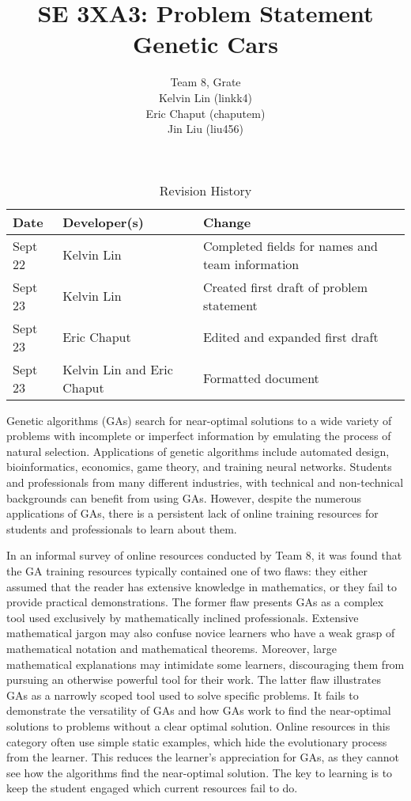 \documentclass{article}
\title{SE 3XA3: Problem Statement\\Genetic Cars}
\author{Team 8, Grate
		\\ Kelvin Lin (linkk4)
		\\ Eric Chaput (chaputem)
		\\ Jin Liu (liu456)
}
\date{}
\begin{document}
\begin{table}[hp]
\color{blue}
\caption{Revision History} \label{TblRevisionHistory}
\begin{tabularx}{\textwidth}{llX}
\toprule
\textbf{Date} & \textbf{Developer(s)} & \textbf{Change}\\
\midrule
Sept 22 & Kelvin Lin & Completed fields for names and team information\\
Sept 23 & Kelvin Lin & Created first draft of problem statement\\
Sept 23 & Eric Chaput & Edited and expanded first draft\\
Sept 23 & Kelvin Lin and Eric Chaput& Formatted document\\

\bottomrule
\end{tabularx}
\end{table}

\newpage
\color{black}
\maketitle

Genetic algorithms (GAs) search for near-optimal solutions to a wide variety of problems with incomplete or imperfect information by emulating the process of natural selection. Applications of genetic algorithms include automated design, bioinformatics, economics, game theory, and training neural networks. Students and professionals from many different industries, with technical and non-technical backgrounds can benefit from using GAs. However, despite the numerous applications of GAs, there is a persistent lack of online training resources for students and professionals to learn about them. 

In an informal survey of online resources conducted by Team 8, it was found that the GA training resources typically contained one of two flaws: they either assumed that the reader has extensive knowledge in mathematics, or they fail to provide practical demonstrations. The former flaw presents GAs as a complex tool used exclusively by mathematically inclined professionals. Extensive mathematical jargon may also confuse novice learners who have a weak grasp of mathematical notation and mathematical theorems. Moreover, large mathematical explanations may intimidate some learners, discouraging them from pursuing an otherwise powerful tool for their work. The latter flaw illustrates GAs as a narrowly scoped tool used to solve specific problems. It fails to demonstrate the versatility of GAs and how GAs work to find the near-optimal solutions to problems without a clear optimal solution. Online resources in this category often use simple static examples, which hide the evolutionary process from the learner. This reduces the learner's appreciation for GAs, as they cannot see how the algorithms find the near-optimal solution. The key to learning is to keep the student engaged which current resources fail to do.
\end{document}
